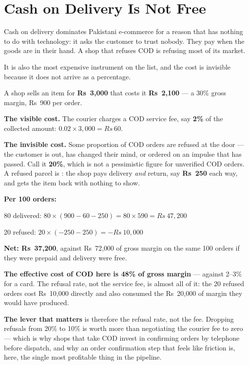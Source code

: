 \section{Cash on Delivery Is Not Free}

Cash on delivery dominates Pakistani e-commerce for a reason that has nothing
to do with technology: it asks the customer to trust nobody. They pay when the
goods are in their hand. A shop that refuses COD is refusing most of its
market.

It is also the most expensive instrument on the list, and the cost is invisible
because it does not arrive as a percentage.

\begin{worked}
A shop sells an item for \textbf{Rs~3{,}000} that costs it \textbf{Rs~2{,}100}
--- a 30\% gross margin, Rs~900 per order.

\smallskip
\textbf{The visible cost.} The courier charges a COD service fee, say
\textbf{2\%} of the collected amount: $0.02 \times 3{,}000 = Rs~60$.

\smallskip
\textbf{The invisible cost.} Some proportion of COD orders are refused at the
door --- the customer is out, has changed their mind, or ordered on an impulse
that has passed. Call it \textbf{20\%}, which is not a pessimistic figure for
unverified COD orders. A refused parcel is : the shop
pays delivery \emph{and} return, say \textbf{Rs~250} each way, and gets the
item back with nothing to show.

\smallskip
\textbf{Per 100 orders:}
\begin{tight}
  \item 80 delivered: $80 \times (900 - 60 - 250) = 80 \times 590 =
        Rs~47{,}200$
  \item 20 refused: $20 \times (-250 - 250) = -Rs~10{,}000$
  \item \textbf{Net: Rs~37{,}200}, against Rs~72{,}000 of gross margin on the
        same 100 orders if they were prepaid and delivery were free.
\end{tight}

\smallskip
\textbf{The effective cost of COD here is 48\% of gross margin} --- against
2--3\% for a card. The refusal rate, not the service fee, is almost all of it:
the 20 refused orders cost Rs~10{,}000 directly and also consumed the
Rs~20{,}000 of margin they would have produced.

\smallskip
\textbf{The lever that matters} is therefore the refusal rate, not the fee.
Dropping refusals from 20\% to 10\% is worth more than negotiating the courier
fee to zero --- which is why shops that take COD invest in confirming orders by
telephone before dispatch, and why an order confirmation step that feels like
friction is, here, the single most profitable thing in the pipeline.
\end{worked}

